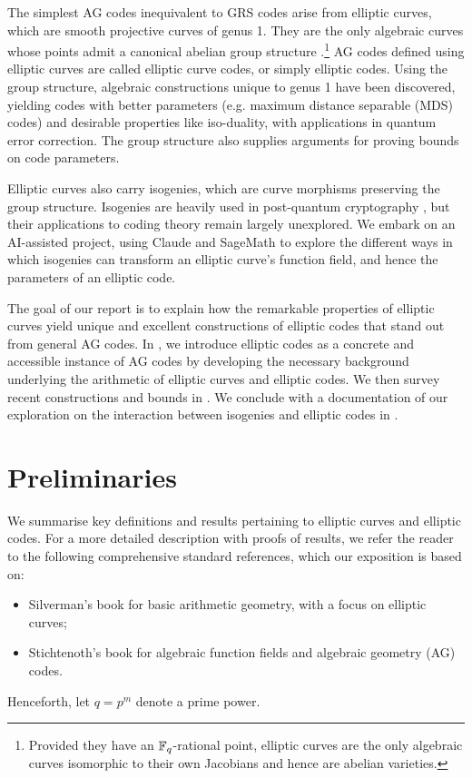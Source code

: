 \documentclass[twocolumn, 11pt]{scrartcl}
\begin{document}
The simplest AG codes inequivalent to GRS codes arise from elliptic curves, which are smooth projective curves of genus 1. They are the only algebraic curves whose points admit a canonical abelian group structure \cite[\S X.3]{silverman2009arithmetic}.\footnote{Provided they have an $\mathbb{F}_q$-rational point, elliptic curves are the only algebraic curves isomorphic to their own Jacobians and hence are abelian varieties.} AG codes defined using elliptic curves are called elliptic curve codes, or simply elliptic codes. Using the group structure, algebraic constructions unique to genus 1 have been discovered, yielding codes with better parameters (e.g. maximum distance separable (MDS) codes) and desirable properties like iso-duality, with applications in quantum error correction. The group structure also supplies arguments for proving bounds on code parameters.

Elliptic curves also carry isogenies, which are curve morphisms preserving the group structure. Isogenies are heavily used in post-quantum cryptography \cite{jamielow2027,basso2026prism,NISTPQC-ADD-R3:SQIsign26}, but their applications to coding theory remain largely unexplored. We embark on an AI-assisted project, using Claude and SageMath to explore the different ways in which isogenies can transform an elliptic curve's function field, and hence the parameters of an elliptic code.

The goal of our report is to explain how the remarkable properties of elliptic curves yield unique and excellent constructions of elliptic codes that stand out from general AG codes. In , we introduce elliptic codes as a concrete and accessible instance of AG codes by developing the necessary background underlying the arithmetic of elliptic curves and elliptic codes. We then survey recent constructions and bounds in . We conclude with a documentation of our exploration on the interaction between isogenies and elliptic codes in .

\section{Preliminaries} \label{section:preliminaries}

We summarise key definitions and results pertaining to elliptic curves and elliptic codes. For a more detailed description with proofs of results, we refer the reader to the following comprehensive standard references, which our exposition is based on:
\begin{itemize}[itemsep=-8pt]
    \item Silverman's book \cite{silverman2009arithmetic} for basic arithmetic geometry, with a focus on elliptic curves;
    \item Stichtenoth's book \cite{stichtenoth2009algebraic} for algebraic function fields and algebraic geometry (AG) codes.
\end{itemize}
Henceforth, let $q=p^m$ denote a prime power.
\end{document}
